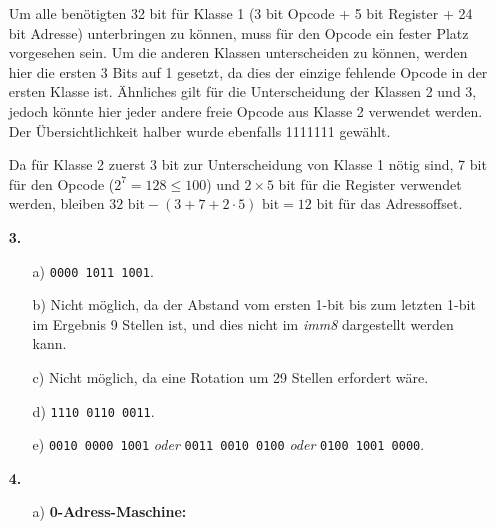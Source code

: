 \documentclass[a4paper,10pt]{scrartcl}
\begin{document}
\begin{enumerate}

        Um alle benötigten 32 bit für Klasse 1 (3 bit Opcode + 5 bit Register + 24 bit Adresse)
        unterbringen zu können, muss für den Opcode ein fester Platz vorgesehen sein. Um die
        anderen Klassen unterscheiden zu können, werden hier die ersten 3 Bits auf 1 gesetzt,
        da dies der einzige fehlende Opcode in der ersten Klasse ist. Ähnliches gilt
        für die Unterscheidung der Klassen 2 und 3, jedoch könnte hier jeder andere
        freie Opcode aus Klasse 2 verwendet werden. Der Übersichtlichkeit halber
        wurde ebenfalls 1111111 gewählt.

        Da für Klasse 2 zuerst 3 bit zur Unterscheidung von Klasse 1 nötig sind,
        7 bit für den Opcode ($2^7 = 128 \leq 100$) und $2 \times 5$ bit für
        die Register verwendet werden, bleiben $32 \text{ bit} - (3 + 7 + 2 \cdot 5) \text{ bit}
        = 12 \text{ bit}$ für das Adressoffset.


    \item[\textbf{3.}]
        \begin{enumerate}
            \item[a)] \texttt{0000 1011 1001}.
            \item[b)] Nicht möglich, da der Abstand vom ersten 1-bit bis zum letzten 1-bit im Ergebnis 9 Stellen ist, und dies nicht im \emph{imm8} dargestellt werden kann.
            \item[c)] Nicht möglich, da eine Rotation um 29 Stellen erfordert wäre.
            \item[d)] \texttt{1110 0110 0011}.
            \item[e)] \texttt{0010 0000 1001} \emph{oder} \texttt{0011 0010 0100} \emph{oder} \texttt{0100 1001 0000}.
        \end{enumerate}
    \item[\textbf{4.}]
        \begin{enumerate}
            \item[a)]
                \textbf{0-Adress-Maschine:}


\end{enumerate}
\end{enumerate}
\end{document}
